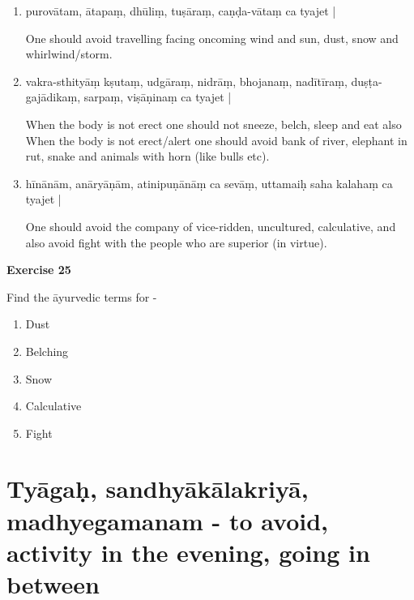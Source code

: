 \begin{enumerate}
\item {}

purovātam, ātapaṃ, dhūliṃ, tuṣāraṃ, caṇḍa-vātaṃ ca tyajet |

One should avoid travelling facing oncoming wind and sun, dust, snow and whirlwind/storm.  

\item {}

vakra-sthityāṃ kṣutaṃ, udgāraṃ, nidrāṃ, bhojanaṃ, nadītīraṃ, duṣṭa-gajādikaṃ, sarpaṃ, viṣāṇinaṃ ca  tyajet | 

When the body is not erect one should not sneeze, belch, sleep and eat  also When the body is not erect/alert one should avoid bank of river, elephant in rut, snake and animals with horn (like bulls etc).   

\item {}

hīnānām, anāryāṇām, atinipuṇānāṃ ca sevāṃ, uttamaiḥ saha kalahaṃ ca tyajet | 

One should avoid the company of vice-ridden, uncultured, calculative, and also avoid fight with the people who are superior (in virtue).
\end{enumerate}

\begin{center}
\textbf{\large Exercise 25}
\end{center}

Find the āyurvedic terms for -
\begin{enumerate}
\renewcommand{\theenumi}{\alph{enumi}}
\renewcommand{\labelenumi}{\theenumi.}
\item Dust
\item Belching
\item Snow
\item Calculative
\item Fight
\end{enumerate}

\chapter{Tyāgaḥ, sandhyākālakriyā, madhyegamanam - to avoid, activity in the evening, going in between}

